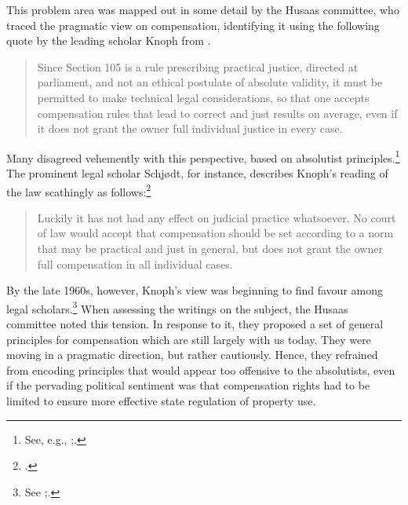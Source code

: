 
This problem area was mapped out in some detail by the Husaas committee, who traced the pragmatic view on compensation, identifying it using the following quote by the leading scholar Knoph from \cite[113]{knoph39}.

\begin{quote}
Since Section 105 is a rule prescribing practical justice, directed at parliament, and not an ethical postulate of absolute validity, it must be permitted to make technical legal considerations, so that one accepts compensation rules that lead to correct and just results on average, even if it does not grant the owner full individual justice in every case.
\end{quote}

Many disagreed vehemently with this perspective, based on absolutist principles.\footnote{See, e.g., \cite[20-22]{robberstad57};\cite[44]{schjodt47}.} The prominent legal scholar Schjødt, for instance, describes Knoph's reading of the law scathingly as follows:\footcite[44]{schjodt47}

\begin{quote}Luckily it has not had any effect on judicial practice whatsoever. No court of law would accept that compensation should be set according to a norm that may be practical and just in general, but does not grant the owner full compensation in all individual cases.
\end{quote}

By the late 1960s, however, Knoph's view was beginning to find favour among legal scholars.\footnote{See \cite[17]{fleischer68};\cite[41]{opshal68}.} When assessing the writings on the subject, the Husaas committee noted this tension. In response to it, they proposed a set of general principles for compensation which are still largely with us today. They were moving in a pragmatic direction, but rather cautiously. Hence, they refrained from encoding principles that would appear too offensive to the absolutists, even if the pervading political sentiment was that compensation rights had to be limited to ensure more effective state regulation of property use.

